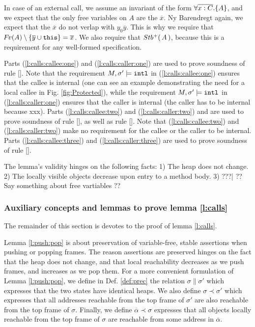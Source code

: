 In case of an external call, we assume an  invariant of the form ${\forall {\overline {x:C}}.{{\{}}{A}{{\}}}}$, and we
expect that the only free variables on $A$ are the $\overline x$.
Ny Barendregt again, we expect that the $\overline x$ do not verlap with $y_0 \overline y$. 
This is why we require that  ${\hspace{-1pt}F\hspace{-1pt}}v(A)\setminus\{ {\overline{y}} \cup \mbox{\normalfont{\texttt{this}}} \} =\overline{x}$. 
We also require that ${Stb^+(\, A\, )}$, because this is a requirement for any well-formed  specification.

 
Parts
 (\ref{l:calls:callee:one})  and (\ref{l:calls:caller:one})  are  used to prove soundness of rule {[]}.
  Note that the requirement $M, \sigma' \models \mbox{\normalfont{\texttt{intl}}} $  in (\ref{l:calls:callee:one}) ensures that the callee is internal
  (one can see an example demonstrating the need for a local callee in Fig.  \ref{fig:Protected}),
  while the requirement $M, \sigma' \models \mbox{\normalfont{\texttt{intl}}} $  in   (\ref{l:calls:caller:one}) ensures that the caller is internal
  (the caller has to be internal because xxx).
Parts
 (\ref{l:calls:callee:two}) and (\ref{l:calls:caller:two}) and are  used to prove soundness of rule {[]},
as well as rule {[]}.
  Note that   (\ref{l:calls:callee:two}) and (\ref{l:calls:caller:two}) make no requirement for the callee or the caller to be internal.  
 Parts
(\ref{l:calls:callee:three}) and (\ref{l:calls:caller:three}) are  used to prove soundness of rule {[]}.

The lemma's validity hinges on the following facts: 
1) The heap does not change.
2)  The locally visible objects decrease upon entry to a method body. 
3) ???|
?? Say something about free vartiables ??

\vspace{.2cm}
\subsubsection{Auxiliary concepts and lemmas to prove  lemma  \ref{l:calls}}
The remainder of this section is devotes to the proof of lemma  \ref{l:calls}.

Lemma \ref{l:push:pop} is  about preservation of variable-free, stable assertions when pushing or popping frames. 
The reason assertions are preserved hinges on the fact that the heap does not change, and that  local reachability decreases as we push frames, and increases as we pop them.
 For a more convenient formulation of Lemma \ref{l:push:pop}, we define in Def. \ref{def:prec} the relation  $\sigma \parallel \sigma' $ which expresses that the two states have identical heaps. 
 We also define 
 $\sigma \prec \sigma'$ which expresses that all addresses reachable from the top frame of $\sigma'$ are also reachable from the top frame of $\sigma$. 
Finally, we define  $\overline \alpha \prec \sigma$ expresses that all objects locally reachable from the top frame of $\sigma$ are reachable from some address in $\overline \alpha$.
 
